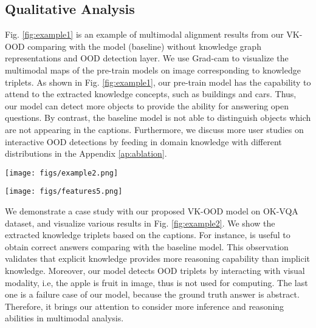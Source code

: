 \documentclass{article}
\begin{document}
\subsection{Qualitative Analysis}
\label{sec:qualitative}


Fig. \ref{fig:example1} is an example of multimodal alignment results from our VK-OOD comparing with the model (baseline) without knowledge graph representations and OOD detection layer. We use Grad-cam \cite{selvaraju2017grad} to visualize the multimodal maps of the pre-train models on image corresponding to knowledge triplets. As shown in Fig. \ref{fig:example1}, our pre-train model has the capability to attend to the extracted knowledge concepts, such as buildings and cars. Thus, our model can detect more objects to provide the ability for answering  open questions. By contrast, the baseline model is not able to distinguish objects which are not appearing in the captions. Furthermore, we discuss more user studies on interactive OOD detections by feeding in domain knowledge with different distributions in the Appendix \ref{ap:ablation}.





\begin{figure*}
\texttt{[image: figs/example2.png]}
\centering
\caption{Example case studies with OK-VAQ dataset. We show retrieved explicit knowledge triplets. The number of example triplets is 2. Our model is able to detect outliers of retrieved triplets shown in the first row examples. The predicted answers are from our proposed VK-OOD model finetuning on OKVQA dataset. Comparing with the baseline results, our model provides more correct answers. Note that, the baseline model is trained without KG and OOD components.\label{fig:example2}}
\end{figure*}

\begin{figure*}
\centering
\texttt{[image: figs/features5.png]}
\caption{Visualization of the multimodal feature space.  denotes the number of clusters. \label{fig:feature}}
\end{figure*}

We demonstrate a case study with our proposed VK-OOD model on OK-VQA dataset, and visualize various results in Fig. \ref{fig:example2}. We show the extracted knowledge triplets based on the captions. For instance, \textrangle{} is useful to obtain correct answers comparing with the baseline model. This observation validates that explicit knowledge provides more reasoning capability than implicit knowledge. Moreover, our model detects OOD triplets by interacting with visual modality, i.e, the apple is fruit in image, thus is not used for computing. The last one is a failure case of our model, because the ground truth answer is abstract. Therefore, it brings our attention to consider more inference and reasoning abilities in multimodal analysis.
\end{document}
